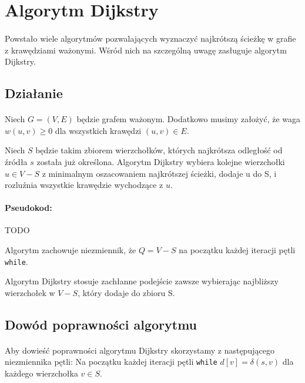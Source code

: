 \section{Algorytm Dijkstry}

\label{sec:dijkstra}

\paragraph{}Powstało wiele algorytmów pozwalających wyznaczyć najkrótszą ścieżkę w grafie z
krawędziami ważonymi. Wśród nich na szczególną uwagę zasługuje algorytm Dijkstry.

\subsection{Działanie}

\paragraph{}Niech $G = (V, E)$ będzie grafem ważonym. Dodatkowo musimy założyć, że waga $w(u,v) \ge 0$
dla wszystkich krawędzi $(u, v) \in E$.

Niech $S$ będzie takim zbiorem wierzchołków, których najkrótsza odległość od źródła
$s$ została już określona. Algorytm Dijkstry wybiera kolejne wierzchołki $u \in V - S$
z minimalnym oszacowaniem najkrótszej ścieżki, dodaje u do S, i rozluźnia wszystkie krawędzie wychodzące z $u$.

\paragraph{Pseudokod:}
TODO

Algorytm zachowuje niezmiennik, że $Q = V - S$ na początku każdej iteracji pętli \texttt{while}.

Algorytm Dijkstry stosuje zachłanne podejście zawsze wybierając najbliższy wierzchołek
w $V - S$, który dodaje do zbioru S.

\subsection{Dowód poprawności algorytmu}

\paragraph{}Aby dowieść poprawności algorytmu Dijkstry skorzystamy z następującego niezmiennika pętli:
Na początku każdej iteracji pętli \texttt{while} $d[v] = \delta(s,v)$ dla każdego wierzchołka $v \in S$.

